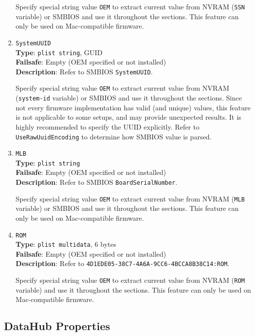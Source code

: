 \documentclass[]{article}
\makeatletter
\renewcommand{\label}[1]{%
\zref@wrapper@immediate{\oldlabel{#1}}}  %
\makeatother
\begin{document}
\begin{enumerate}
  Specify special string value \texttt{OEM} to extract current value from NVRAM
  (\texttt{SSN} variable) or SMBIOS and use it throughout the sections.
  This feature can only be used on Mac-compatible firmware.
\item
  \texttt{SystemUUID}\\
  \textbf{Type}: \texttt{plist\ string}, GUID\\
  \textbf{Failsafe}: Empty (OEM specified or not installed)\\
  \textbf{Description}: Refer to SMBIOS \texttt{SystemUUID}.

  Specify special string value \texttt{OEM} to extract current value from NVRAM
  (\texttt{system-id} variable) or SMBIOS and use it throughout the sections.
  Since not every firmware implementation has valid (and unique) values, this
  feature is not applicable to some setups, and may provide unexpected results.
  It is highly recommended to specify the UUID explicitly. Refer to
  \texttt{UseRawUuidEncoding} to determine how SMBIOS value is parsed.
\item
  \texttt{MLB}\\
  \textbf{Type}: \texttt{plist\ string}\\
  \textbf{Failsafe}: Empty (OEM specified or not installed)\\
  \textbf{Description}: Refer to SMBIOS \texttt{BoardSerialNumber}.

  Specify special string value \texttt{OEM} to extract current value from NVRAM
  (\texttt{MLB} variable) or SMBIOS and use it throughout the sections.
  This feature can only be used on Mac-compatible firmware.
\item
  \texttt{ROM}\\
  \textbf{Type}: \texttt{plist\ multidata}, 6 bytes\\
  \textbf{Failsafe}: Empty (OEM specified or not installed)\\
  \textbf{Description}: Refer to
  \texttt{4D1EDE05-38C7-4A6A-9CC6-4BCCA8B38C14:ROM}.

  Specify special string value \texttt{OEM} to extract current value from NVRAM
  (\texttt{ROM} variable) and use it throughout the sections.
  This feature can only be used on Mac-compatible firmware.

\end{enumerate}

\subsection{DataHub Properties}\label{platforminfodatahub}
\end{document}
